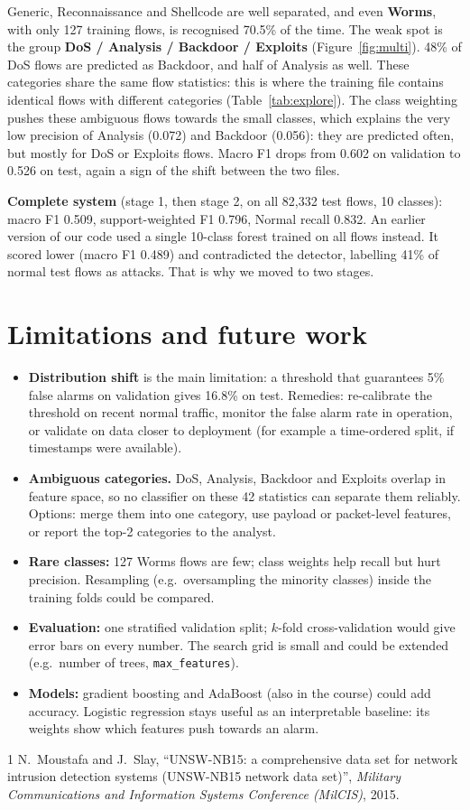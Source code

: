 \documentclass[11pt,a4paper]{article}
\begin{document}
Generic, Reconnaissance and Shellcode are well separated, and even \textbf{Worms}, with only 127
training flows, is recognised 70.5\% of the time. The weak spot is the group \textbf{DoS / Analysis /
Backdoor / Exploits} (Figure~\ref{fig:multi}). 48\% of DoS flows are predicted as Backdoor, and half
of Analysis as well. These categories share the same flow statistics: this is where the training
file contains identical flows with different categories (Table~\ref{tab:explore}). The class
weighting pushes these ambiguous flows towards the small classes, which explains the very low
precision of Analysis (0.072) and Backdoor (0.056): they are predicted often, but mostly for DoS or
Exploits flows. Macro F1 drops from 0.602 on validation to 0.526 on test, again a sign of the shift
between the two files.

\textbf{Complete system} (stage 1, then stage 2, on all 82{,}332 test flows, 10 classes): macro F1
0.509, support-weighted F1 0.796, Normal recall 0.832. An earlier version of our code used a single
10-class forest trained on all flows instead. It scored lower (macro F1 0.489) and contradicted the
detector, labelling 41\% of normal test flows as attacks. That is why we moved to two stages.

\section{Limitations and future work}
\begin{itemize}
\item \textbf{Distribution shift} is the main limitation: a threshold that guarantees 5\% false
alarms on validation gives 16.8\% on test. Remedies: re-calibrate the threshold on recent normal
traffic, monitor the false alarm rate in operation, or validate on data closer to deployment
(for example a time-ordered split, if timestamps were available).
\item \textbf{Ambiguous categories.} DoS, Analysis, Backdoor and Exploits overlap in feature space,
so no classifier on these 42 statistics can separate them reliably. Options: merge them into one
category, use payload or packet-level features, or report the top-2 categories to the analyst.
\item \textbf{Rare classes:} 127 Worms flows are few; class weights help recall but hurt precision.
Resampling (e.g.\ oversampling the minority classes) inside the training folds could be compared.
\item \textbf{Evaluation:} one stratified validation split; $k$-fold cross-validation would give
error bars on every number. The search grid is small and could be extended (e.g.\ number of trees,
\texttt{max\_features}).
\item \textbf{Models:} gradient boosting and AdaBoost (also in the course) could add accuracy.
Logistic regression stays useful as an interpretable baseline: its weights show which features
push towards an alarm.
\end{itemize}

\begin{thebibliography}{1}\small
{} N.~Moustafa and J.~Slay, ``UNSW-NB15: a comprehensive data set for network intrusion
detection systems (UNSW-NB15 network data set)'', \emph{Military Communications and Information
Systems Conference (MilCIS)}, 2015.
\end{thebibliography}
\end{document}
